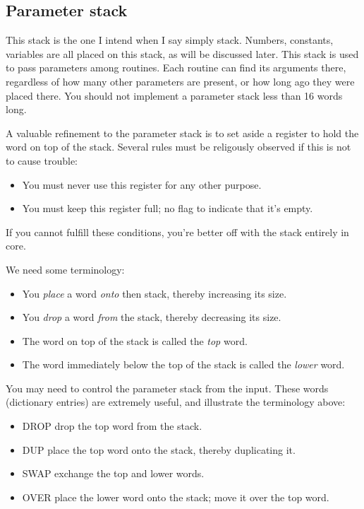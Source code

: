 \documentclass[b5paper, oneside]{book}
\begin{document}
\subsection{Parameter stack}
This stack is the one I intend when I say simply stack. Numbers, constants, variables are all placed on this stack, as will be discussed later. This stack is used to pass parameters among routines. Each routine can find its arguments there, regardless of how many other parameters are present, or how long ago they were placed there. You should not implement a parameter stack less than 16 words long.

A valuable refinement to the parameter stack is to set aside a register to hold the word on top of the stack. Several rules must be religously observed if this is not to cause trouble:\begin{itemize}
   \item You must never use this register for any other purpose.
   \item You must keep this register full; no flag to indicate that it's empty.\end{itemize}
If you cannot fulfill these conditions, you're better off with the stack entirely in core.

We need some terminology:\begin{itemize}
   \item You {\em place} a word {\em onto} then stack, thereby increasing its size.
   \item You {\em drop} a word {\em from} the stack, thereby decreasing its size.
   \item The word on top of the stack is called the {\em top} word.
   \item The word immediately below the top of the stack is called the {\em lower} word.\end{itemize}
You may need to control the parameter stack from the input. These words (dictionary entries) are extremely useful, and illustrate the terminology above:\begin{itemize}
   \item DROP drop the top word from the stack.
   \item DUP place the top word onto the stack, thereby duplicating it.
   \item SWAP exchange the top and lower words.
   \item OVER place the lower word onto the stack; move it over the top word.\end{itemize}
\end{document}
